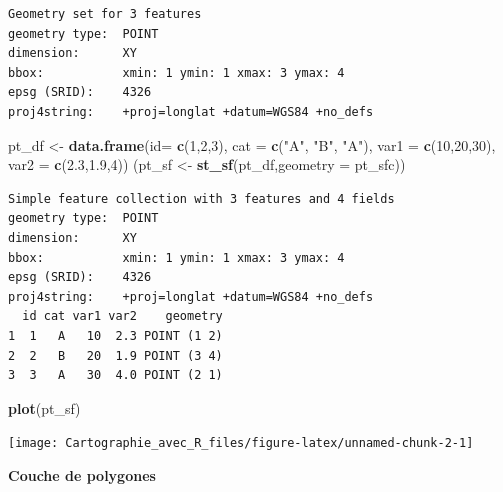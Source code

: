 \documentclass[]{book}
\newenvironment{Shaded}{\begin{snugshade}}{\end{snugshade}}
\newcommand{\KeywordTok}[1]{\textcolor[rgb]{0.13,0.29,0.53}{\textbf{#1}}}
\newcommand{\DataTypeTok}[1]{\textcolor[rgb]{0.13,0.29,0.53}{#1}}
\newcommand{\DecValTok}[1]{\textcolor[rgb]{0.00,0.00,0.81}{#1}}
\newcommand{\FloatTok}[1]{\textcolor[rgb]{0.00,0.00,0.81}{#1}}
\newcommand{\StringTok}[1]{\textcolor[rgb]{0.31,0.60,0.02}{#1}}
\newcommand{\NormalTok}[1]{#1}
\begin{document}
\begin{verbatim}
Geometry set for 3 features 
geometry type:  POINT
dimension:      XY
bbox:           xmin: 1 ymin: 1 xmax: 3 ymax: 4
epsg (SRID):    4326
proj4string:    +proj=longlat +datum=WGS84 +no_defs
\end{verbatim}

\begin{Shaded}
\begin{Highlighting}[]
\NormalTok{pt_df <-}\StringTok{ }\KeywordTok{data.frame}\NormalTok{(}\DataTypeTok{id=} \KeywordTok{c}\NormalTok{(}\DecValTok{1}\NormalTok{,}\DecValTok{2}\NormalTok{,}\DecValTok{3}\NormalTok{), }\DataTypeTok{cat =} \KeywordTok{c}\NormalTok{(}\StringTok{"A"}\NormalTok{, }\StringTok{"B"}\NormalTok{, }\StringTok{"A"}\NormalTok{), }
                    \DataTypeTok{var1 =} \KeywordTok{c}\NormalTok{(}\DecValTok{10}\NormalTok{,}\DecValTok{20}\NormalTok{,}\DecValTok{30}\NormalTok{), }\DataTypeTok{var2 =} \KeywordTok{c}\NormalTok{(}\FloatTok{2.3}\NormalTok{,}\FloatTok{1.9}\NormalTok{,}\DecValTok{4}\NormalTok{))}
\NormalTok{(pt_sf <-}\StringTok{ }\KeywordTok{st_sf}\NormalTok{(pt_df,}\DataTypeTok{geometry =}\NormalTok{ pt_sfc))}
\end{Highlighting}
\end{Shaded}

\begin{verbatim}
Simple feature collection with 3 features and 4 fields
geometry type:  POINT
dimension:      XY
bbox:           xmin: 1 ymin: 1 xmax: 3 ymax: 4
epsg (SRID):    4326
proj4string:    +proj=longlat +datum=WGS84 +no_defs
  id cat var1 var2    geometry
1  1   A   10  2.3 POINT (1 2)
2  2   B   20  1.9 POINT (3 4)
3  3   A   30  4.0 POINT (2 1)
\end{verbatim}

\begin{Shaded}
\begin{Highlighting}[]
\KeywordTok{plot}\NormalTok{(pt_sf)}
\end{Highlighting}
\end{Shaded}

\begin{center}\texttt{[image: Cartographie\_avec\_R\_files/figure-latex/unnamed-chunk-2-1]} \end{center}

\textbf{Couche de polygones}
\end{document}
